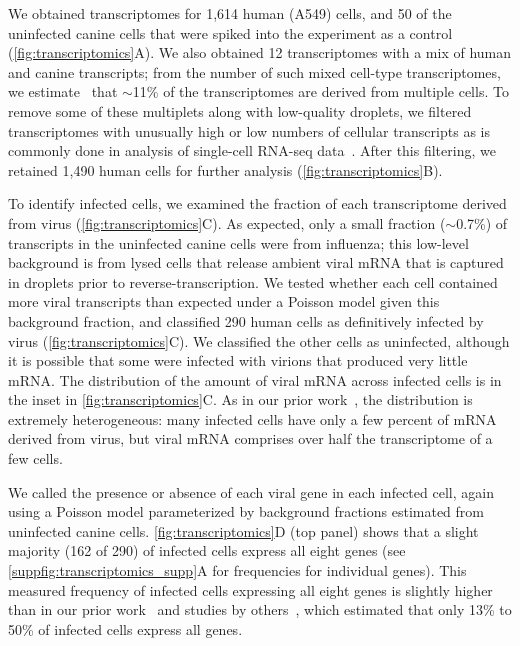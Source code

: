 \documentclass[10pt,letterpaper]{article}
\newcommand{\FIG}[1]{\autoref{fig:#1}}
\newcommand{\SUPPFIG}[1]{\autoref{suppfig:#1}}
\begin{document}
We obtained transcriptomes for 1,614 human (A549) cells, and 50 of the uninfected canine cells that were spiked into the experiment as a control (\FIG{transcriptomics}A).
We also obtained 12 transcriptomes with a mix of human and canine transcripts; from the number of such mixed cell-type transcriptomes, we estimate~\citep{bloom2018estimating} that $\sim$11\% of the transcriptomes are derived from multiple cells.
To remove some of these multiplets along with low-quality droplets, we filtered transcriptomes with unusually high or low numbers of cellular transcripts as is commonly done in analysis of single-cell RNA-seq data~\citep{haque2017practical}.
After this filtering, we retained 1,490 human cells for further analysis (\FIG{transcriptomics}B).

To identify infected cells, we examined the fraction of each transcriptome derived from virus (\FIG{transcriptomics}C).
As expected, only a small fraction ($\sim$0.7\%) of transcripts in the uninfected canine cells were from influenza; this low-level background is from lysed cells that release ambient viral mRNA that is captured in droplets prior to reverse-transcription.
We tested whether each cell contained more viral transcripts than expected under a Poisson model given this background fraction, and classified 290 human cells as definitively infected by virus (\FIG{transcriptomics}C).
We classified the other cells as uninfected, although it is possible that some were infected with virions that produced very little mRNA.
The distribution of the amount of viral mRNA across infected cells is in the inset in \FIG{transcriptomics}C.
As in our prior work~\citep{russell2018extreme}, the distribution is extremely heterogeneous: many infected cells have only a few percent of mRNA derived from virus, but viral mRNA comprises over half the transcriptome of a few cells.

We called the presence or absence of each viral gene in each infected cell, again using a Poisson model parameterized by background fractions estimated from uninfected canine cells.
\FIG{transcriptomics}D (top panel) shows that a slight majority (162 of 290) of infected cells express all eight genes (see \SUPPFIG{transcriptomics_supp}A for frequencies for individual genes).
This measured frequency of infected cells expressing all eight genes is slightly higher than in our prior work~\citep{russell2018extreme} and studies by others~\citep{brooke2013most, heldt2015single, dou2017analysis}, which estimated that only 13\% to 50\% of infected cells express all genes. 
\end{document}
